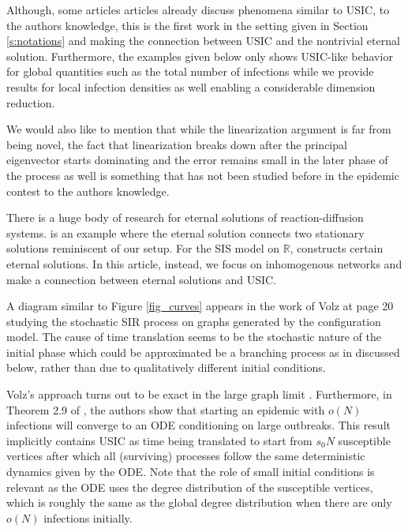 \documentclass{article}
\newcommand{\1}[1]{{\mathds{1}}_{\left\{#1\right\}}}
\newcommand{\rem}[1]{{#1}}
\begin{document}
\rem{Although, some articles articles already discuss phenomena similar to USIC, to the authors knowledge, this is the first work in the setting given in Section \ref{s:notations} and making the connection between USIC and the nontrivial eternal solution. Furthermore, the examples given below only shows USIC-like behavior for global quantities such as the total number of infections while we provide results for local infection densities as well enabling a considerable dimension reduction.

We would also like to mention that while the linearization argument is far from being novel, the fact that linearization breaks down after the principal eigenvector starts dominating and the error remains small in the later phase of the process as well is something that has not been studied before in the epidemic contest to the authors knowledge. 
}

There is a huge body of research for eternal solutions of reaction-diffusion systems. \cite{reaction_eternal} is an example where the eternal solution connects two stationary solutions reminiscent of our setup. For the SIS model on $\mathbb{R}$, \cite{SIS_PDE_on_R} constructs certain eternal solutions. \rem{In this article, instead, we focus on inhomogenous networks and make a connection between eternal solutions and USIC.  }

A diagram similar to Figure \ref{fig_curves} appears in the work of Volz \cite{volz} \rem{at page 20} studying the stochastic SIR process on graphs generated by the configuration model. \rem{The cause of time translation seems to be the stochastic nature of the initial phase which could be approximated be a branching process as in \cite{SIR_USIC, SIR_USIC_Juli} discussed below, rather than due to qualitatively different initial conditions.   }

Volz's approach turns out to be exact in the large graph limit \cite{volzproof,volz_proof_readable}. Furthermore, in Theorem 2.9 of \cite{volz_proof_readable}, the authors show that starting an epidemic with $o(\rem{N})$ infections will converge to an ODE conditioning on large outbreaks. This result implicitly contains USIC as time being translated to start from $s_0\rem{N}$ susceptible vertices after which all (surviving) processes follow the same deterministic dynamics given by the ODE. Note that the role of small initial conditions is relevant as the ODE uses the degree distribution of the susceptible vertices, which is roughly the same as the global degree distribution when there are only $o(\rem{N})$ infections initially.
\end{document}
